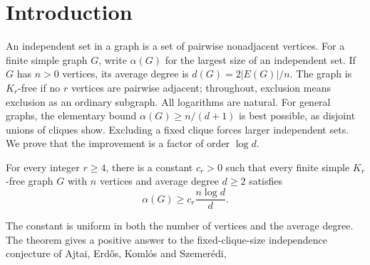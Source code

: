 \section{Introduction}
\label{sec:introduction}

An independent set in a graph is a set of pairwise nonadjacent vertices.
For a finite simple graph $G$, write $\alpha(G)$ for the largest size of
an independent set. If $G$ has $n>0$ vertices, its average degree is
$d(G)=2|E(G)|/n$. The graph is $K_r$-free if no $r$ vertices are pairwise
adjacent; throughout, exclusion means exclusion as an ordinary subgraph.
All logarithms are natural. For general graphs, the elementary bound
$\alpha(G)\ge n/(d+1)$ is best possible, as disjoint unions of cliques
show. Excluding a fixed clique forces larger independent sets. We prove
that the improvement is a factor of order $\log d$.

\begin{theorem}\label{thm:main}
For every integer $r\ge4$, there is a constant $c_r>0$ such that every
finite simple $K_r$-free graph $G$ with $n$ vertices and average degree $d\ge2$
satisfies
\[
 \alpha(G)\ge c_r\frac{n\log d}{d}.
\]
\end{theorem}

The constant is uniform in both the number of vertices and the average
degree. The theorem gives a positive answer to the fixed-clique-size
independence conjecture of Ajtai, Erd\H{o}s, Koml\'os and Szemer\'edi,
